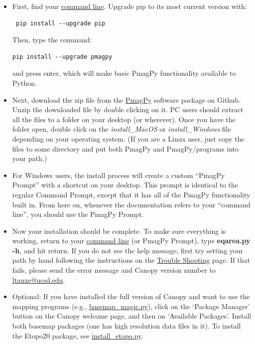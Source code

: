 \documentclass[11pt]{book}
\begin{document}
{\begin{itemize}
   \item First, find your \href{#command_line}{command line}. Upgrade pip to its most current version with: \begin{verbatim} pip install --upgrade pip \end{verbatim}Then, type the command: \begin{verbatim}pip install --upgrade pmagpy \end{verbatim} and press enter, which will make basic PmagPy functionality available to Python.
   \item Next, download the zip file from the \href{https://github.com/ltauxe/PmagPy/releases/latest} {PmagPy} software package on Github. Unzip the downloaded file by double clicking on it. PC users should extract all the files to a folder on your desktop (or wherever).  Once you have the folder open, double click on the {\it install\_MacOS} or {\it install\_Windows} file depending on your operating system.  (If you are a Linux user, just copy the files to some directory and put both PmagPy and PmagPy/programs into your path.)
   \item For Windows users, the install process will create a custom ``PmagPy Prompt'' with a shortcut on your desktop.  This prompt is identical to the regular Command Prompt, except that it has all of the PmagPy functionality built in. From here on, whenever the documentation refers to your ``command line'', you should use the PmagPy Prompt.
   \item Now your installation should be complete.  To make sure everything is working, return to your \href{#command_line}{command line} (or PmagPy Prompt), type {\bf eqarea.py -h}, and hit return.  If you do not see the help message, first try setting your path by hand following the instructions on the  \href{#trouble}{Trouble Shooting} page. If that fails, please send the error message and  Canopy version number to \href{mailto:ltauxe@ucsd.edu?subject=PmagPy Cookbook}{ltauxe@ucsd.edu}.
   \item Optional: If you have installed the full version of Canopy and want to use the mapping programs (e.g., \href{#basemap_magic.py}{basemap\_magic.py}), 
     click on  the `Package Manager' button on the Canopy welcome page, and then on `Available Packages'.  Install both basemap packages (one has high resolution data files in it).  To install the Etopo20 package, see \href{#install_etopo.py}{install\_etopo.py}.
   \end{itemize}

}
\end{document}
